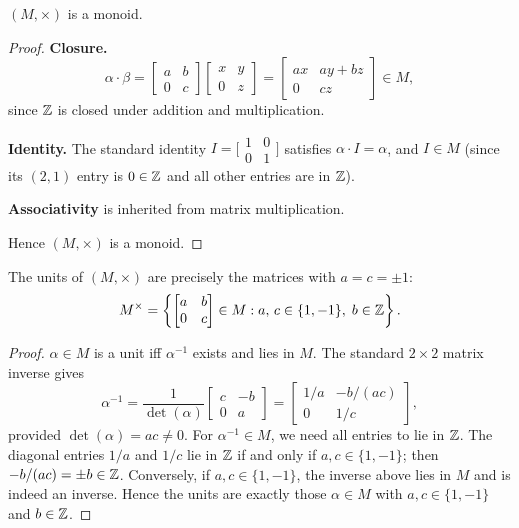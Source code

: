 \begin{proposition}
$(M, \times)$ is a monoid.
\end{proposition}
\begin{proof}
\textbf{Closure.}
\[
    \alpha \cdot \beta
    = \begin{bmatrix} a & b \\ 0 & c \end{bmatrix}
      \begin{bmatrix} x & y \\ 0 & z \end{bmatrix}
    = \begin{bmatrix} ax & ay + bz \\ 0 & cz \end{bmatrix} \in M,
\]
since $\mathbb{Z}$ is closed under addition and multiplication.

\textbf{Identity.}
The standard identity $I = \bigl[\begin{smallmatrix}1&0\\0&1\end{smallmatrix}\bigr]$
satisfies $\alpha \cdot I = \alpha$, and $I \in M$ (since its $(2,1)$ entry is
$0 \in \mathbb{Z}$ and all other entries are in $\mathbb{Z}$).

\textbf{Associativity} is inherited from matrix multiplication.

Hence $(M, \times)$ is a monoid.
\end{proof}

\begin{proposition}
The units of $(M, \times)$ are precisely the matrices with $a = c = \pm 1$:
\[
    M^{\times} = \left\{
        \begin{bmatrix} a & b \\ 0 & c \end{bmatrix} \in M
        : a,\, c \in \{1, -1\},\; b \in \mathbb{Z}
    \right\}.
\]
\end{proposition}
\begin{proof}
$\alpha \in M$ is a unit iff $\alpha^{-1}$ exists and lies in $M$.
The standard $2\times 2$ matrix inverse gives
\[
    \alpha^{-1}
    = \frac{1}{\det(\alpha)}
      \begin{bmatrix} c & -b \\ 0 & a \end{bmatrix}
    = \begin{bmatrix} 1/a & -b/(ac) \\ 0 & 1/c \end{bmatrix},
\]
provided $\det(\alpha) = ac \neq 0$. For $\alpha^{-1} \in M$, we need all
entries to lie in $\mathbb{Z}$. The diagonal entries $1/a$ and $1/c$ lie in $\mathbb{Z}$ if
and only if $a, c \in \{1, -1\}$; then $-b/(ac) = \pm b \in \mathbb{Z}$.
Conversely, if $a, c \in \{1,-1\}$, the inverse above lies in $M$ and is
indeed an inverse. Hence the units are exactly those $\alpha \in M$ with
$a, c \in \{1, -1\}$ and $b \in \mathbb{Z}$.
\end{proof}

